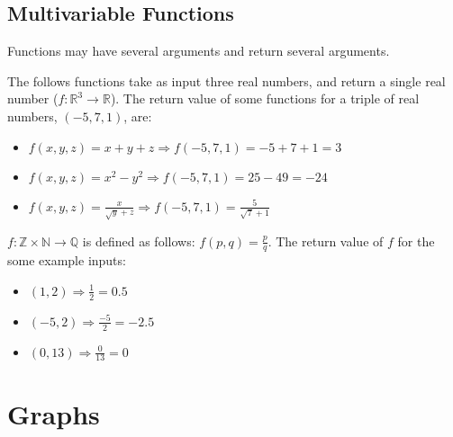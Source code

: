 \subsection{Multivariable Functions}
Functions may have several arguments and return several arguments.
\begin{example}
  The follows functions take as input three real numbers, and return a single real number ($f:\mathbb{R}^{3}\to\mathbb{R}$). The return value of some functions for a triple of real numbers, $\left( -5,7,1 \right)$, are:
  \begin{itemize}
  \item $f\left( x,y,z \right)=x+y+z\Rightarrow f\left( -5,7,1 \right)=-5+7+1=3$
  \item $f\left( x,y,z \right)=x^{2}-y^{2}\Rightarrow f\left( -5,7,1 \right)=25-49=-24$
  \item $f\left( x,y,z \right)=\frac{x}{\sqrt{y}+z}\Rightarrow f\left(-5,7,1  \right)=\frac{5}{\sqrt{7}+1}$
  \end{itemize}
\end{example}
\begin{example}
  $f:\mathbb{Z}\times\mathbb{N}\to \mathbb{Q}$ is defined as follows: $f\left( p,q \right)=\frac{p}{q}$. The return value of $f$ for the some example inputs:
  \begin{itemize}
  \item $\left( 1,2 \right)\Rightarrow \frac{1}{2}=0.5$
  \item $\left( -5,2 \right)\Rightarrow \frac{-5}{2}=-2.5$
  \item $\left( 0,13 \right)\Rightarrow \frac{0}{13}=0$
  \end{itemize}
\end{example}

\section{Graphs}
\def\dis{2.0cm}
\def\dText{0.3}

